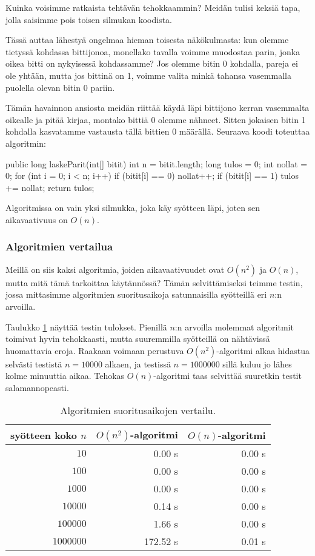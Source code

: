 Kuinka voisimme ratkaista tehtävän tehokkaammin?
Meidän tulisi keksiä tapa, jolla saisimme
pois toisen silmukan koodista.

Tässä auttaa lähestyä ongelmaa hieman toisesta
näkökulmasta: kun olemme tietyssä kohdassa bittijonoa,
monellako tavalla voimme muodostaa parin,
jonka oikea bitti on nykyisessä kohdassamme?
Jos olemme bitin 0 kohdalla, pareja ei ole yhtään,
mutta jos bittinä on 1, voimme valita minkä tahansa
vasemmalla puolella olevan bitin 0 pariin.

Tämän havainnon ansiosta meidän riittää käydä läpi
bittijono kerran vasemmalta oikealle ja pitää kirjaa,
montako bittiä 0 olemme nähneet.
Sitten jokaisen bitin 1 kohdalla kasvatamme
vastausta tällä bittien 0 määrällä.
Seuraava koodi toteuttaa algoritmin:

\begin{code}
public long laskeParit(int[] bitit) {
    int n = bitit.length;
    long tulos = 0;
    int nollat = 0;
    for (int i = 0; i < n; i++) {
        if (bitit[i] == 0) nollat++;
        if (bitit[i] == 1) tulos += nollat;
    }
    return tulos;
}
\end{code}

Algoritmissa on vain yksi silmukka, joka käy syötteen läpi,
joten sen aikavaativuus on $O(n)$.

\subsubsection{Algoritmien vertailua}

Meillä on siis kaksi algoritmia, joiden aikavaativuudet ovat
$O(n^2)$ ja $O(n)$, mutta mitä tämä tarkoittaa käytännössä?
Tämän selvittämiseksi teimme testin,
jossa mittasimme algoritmien suoritusaikoja
satunnaisilla syötteillä eri $n$:n arvoilla.

Taulukko \ref{tab:algver} näyttää testin tulokset.
Pienillä $n$:n arvoilla molemmat algoritmit toimivat
hyvin tehokkaasti, mutta suuremmilla syötteillä on
nähtävissä huomattavia eroja.
Raakaan voimaan perustuva $O(n^2)$-algoritmi
alkaa hidastua selvästi testistä $n=10000$ alkaen,
ja testissä $n=1000000$ sillä kuluu jo lähes kolme minuuttia aikaa.
Tehokas $O(n)$-algoritmi taas selvittää suuretkin testit
salamannopeasti.

\begin{table}
\center
\begin{tabular}{rrr}
syötteen koko $n$ & $O(n^2)$-algoritmi & $O(n)$-algoritmi \\
\hline
$10$ & 0.00 s & 0.00 s\\
$100$ & 0.00 s & 0.00 s\\
$1000$ & 0.00 s & 0.00 s\\
$10000$ & 0.14 s & 0.00 s \\
$100000$ & 1.66 s & 0.00 s \\
$1000000$ & 172.52 s & 0.01 s \\
\end{tabular}
\caption{Algoritmien suoritusaikojen vertailu.}
\label{tab:algver}
\end{table}

